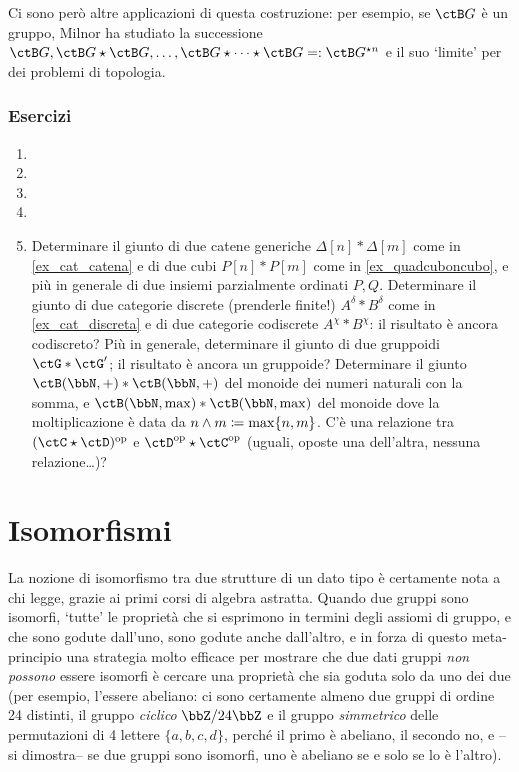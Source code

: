 Ci sono però altre applicazioni di questa costruzione: per esempio, se $\ctB G$ è un gruppo, Milnor \cite{milnor1,milnor2} ha studiato la successione $\ctB G, \ctB G\star\ctB G, \dots, \ctB G \star\dots\star \ctB G =:\ctB G^{\star n}$ e il suo `limite' per dei problemi di topologia.
\subsubsection*{Esercizi}
\begin{enumerate}
	\item
	\item
	\item
	\item
  \item Determinare il giunto di due catene generiche $\Delta[n] * \Delta[m]$ come in \ref{ex_cat_catena} e di due cubi $P[n] * P[m]$ come in \ref{ex_quadcuboncubo}, e più in generale di due insiemi parzialmente ordinati $P,Q$. Determinare il giunto di due categorie discrete (prenderle finite!) $A^\delta * B^\delta$ come in \ref{ex_cat_discreta} e di due categorie codiscrete $A^\chi * B^\chi$: il risultato è ancora codiscreto? Più in generale, determinare il giunto di due gruppoidi $\ctG * \ctG'$; il risultato è ancora un gruppoide? Determinare il giunto $\ctB(\bbN,+) * \ctB(\bbN,+)$ del monoide dei numeri naturali con la somma, e $\ctB(\bbN,\max) * \ctB(\bbN,\max)$ del monoide dove la moltiplicazione è data da $n\land m \coloneqq \max\{n,m\}$. C'è una relazione tra $(\ctC\star\ctD)^\op$ e $\ctD^\op\star\ctC^\op$ (uguali, oposte una dell'altra, nessuna relazione\dots)?
\end{enumerate}
\section{Isomorfismi}\label{sec_isomorfismi}
La nozione di isomorfismo tra due strutture di un dato tipo è certamente nota a chi legge, grazie ai primi corsi di algebra astratta. Quando due gruppi sono isomorfi, `tutte' le proprietà che si esprimono in termini degli assiomi di gruppo, e che sono godute dall'uno, sono godute anche dall'altro, e in forza di questo meta-principio una strategia molto efficace per mostrare che due dati gruppi \emph{non possono} essere isomorfi è cercare una proprietà che sia goduta solo da uno dei due (per esempio, l'essere abeliano: ci sono certamente almeno due gruppi di ordine 24 distinti, il gruppo \emph{ciclico} \(\bbZ/24\bbZ\) e il gruppo \emph{simmetrico} delle permutazioni di 4 lettere \(\{a,b,c,d\}\), perché il primo è abeliano, il secondo no, e --si dimostra-- se due gruppi sono isomorfi, uno è abeliano se e solo se lo è l'altro).

